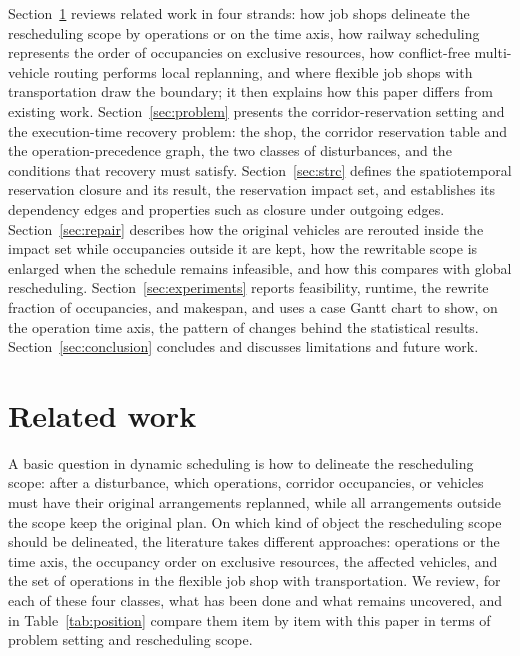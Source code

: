 \documentclass[manuscript,screen,review]{acmart}
\begin{document}
Section~\ref{sec:related_work} reviews related work in four strands: how job shops delineate the rescheduling scope by operations or on the time axis,
how railway scheduling represents the order of occupancies on exclusive resources, how conflict-free multi-vehicle routing performs local replanning,
and where flexible job shops with transportation draw the boundary; it then explains how this paper differs from existing work.
Section~\ref{sec:problem} presents the corridor-reservation setting and the execution-time recovery problem:
the shop, the corridor reservation table and the operation-precedence graph, the two classes of disturbances, and the conditions that recovery must satisfy.
Section~\ref{sec:strc} defines the spatiotemporal reservation closure and its result, the reservation impact set, and establishes its dependency edges and properties such as closure under outgoing edges.
Section~\ref{sec:repair} describes how the original vehicles are rerouted inside the impact set while occupancies outside it are kept,
how the rewritable scope is enlarged when the schedule remains infeasible, and how this compares with global rescheduling.
Section~\ref{sec:experiments} reports feasibility, runtime, the rewrite fraction of occupancies, and makespan,
and uses a case Gantt chart to show, on the operation time axis, the pattern of changes behind the statistical results.
Section~\ref{sec:conclusion} concludes and discusses limitations and future work.

\section{Related work}
\label{sec:related_work}


A basic question in dynamic scheduling is how to delineate the rescheduling scope: after a disturbance, which operations, corridor occupancies, or vehicles must have their original arrangements replanned,
while all arrangements outside the scope keep the original plan.
On which kind of object the rescheduling scope should be delineated, the literature takes different approaches: operations or the time axis, the occupancy order on exclusive resources,
the affected vehicles, and the set of operations in the flexible job shop with transportation.
We review, for each of these four classes, what has been done and what remains uncovered, and in Table~\ref{tab:position} compare them item by item with this paper in terms of problem setting and rescheduling scope.
\end{document}

